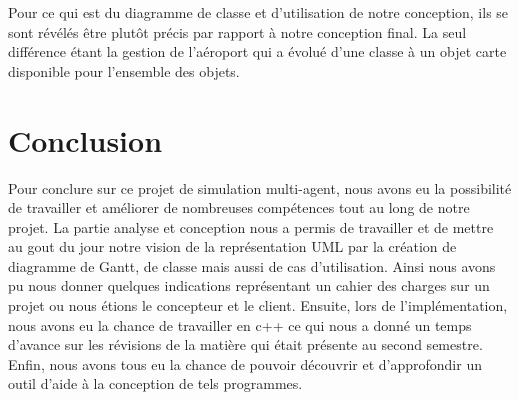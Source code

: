 \documentclass[12pt,french]{article} %
\begin{document}
 
 Pour ce qui est du diagramme de classe et d'utilisation de notre conception, ils se sont révélés être plutôt précis par rapport à notre conception final. La seul différence étant la gestion de l'aéroport qui a évolué d'une classe à un objet carte disponible pour l'ensemble des objets.

\section{Conclusion}

Pour conclure sur ce projet de simulation multi-agent, nous avons eu la possibilité de travailler et améliorer de nombreuses compétences tout au long de notre projet. La partie analyse et conception nous a permis de travailler et de mettre au gout du jour notre vision de la représentation UML par la création de diagramme de Gantt, de classe mais aussi de cas d'utilisation. Ainsi nous avons pu nous donner quelques indications représentant un cahier des charges sur un projet ou nous étions le concepteur et le client. Ensuite, lors de l'implémentation, nous avons eu la chance de travailler en c++ ce qui nous a donné un temps d'avance sur les révisions de la matière qui était présente au second semestre. Enfin, nous avons tous eu la chance de pouvoir découvrir et  d'approfondir un outil d'aide à la conception de tels programmes.   

\listoffigures
\end{document}
